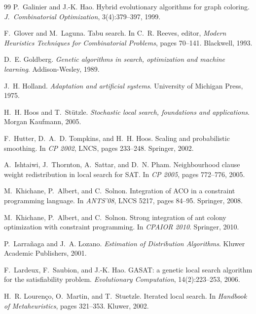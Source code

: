 \documentclass[12pt,a4paper]{book}
\begin{document}
\begin{thebibliography}{99}
P.~Galinier and J.-K. Hao.
\newblock Hybrid evolutionary algorithms for graph coloring.
\newblock \textit{J.\ Combinatorial Optimization}, 3(4):379--397, 1999.

F.~Glover and M.~Laguna.
\newblock Tabu search.
\newblock In C.~R. Reeves, editor, \textit{Modern Heuristics Techniques for Combinatorial Problems}, pages 70--141. Blackwell, 1993.

D.~E. Goldberg.
\newblock \textit{Genetic algorithms in search, optimization and machine learning}.
\newblock Addison-Wesley, 1989.

J.~H. Holland.
\newblock \textit{Adaptation and artificial systems}.
\newblock University of Michigan Press, 1975.

H.~H. Hoos and T.~Stützle.
\newblock \textit{Stochastic local search, foundations and applications}.
\newblock Morgan Kaufmann, 2005.

F.~Hutter, D.~A.~D. Tompkins, and H.~H. Hoos.
\newblock Scaling and probabilistic smoothing.
\newblock In \textit{CP 2002}, LNCS, pages 233--248. Springer, 2002.

A.~Ishtaiwi, J.~Thornton, A.~Sattar, and D.~N. Pham.
\newblock Neighbourhood clause weight redistribution in local search for SAT.
\newblock In \textit{CP 2005}, pages 772--776, 2005.

M.~Khichane, P.~Albert, and C.~Solnon.
\newblock Integration of ACO in a constraint programming language.
\newblock In \textit{ANTS'08}, LNCS 5217, pages 84--95. Springer, 2008.

M.~Khichane, P.~Albert, and C.~Solnon.
\newblock Strong integration of ant colony optimization with constraint programming.
\newblock In \textit{CPAIOR 2010}. Springer, 2010.

P.~Larrañaga and J.~A. Lozano.
\newblock \textit{Estimation of Distribution Algorithms}.
\newblock Kluwer Academic Publishers, 2001.

F.~Lardeux, F.~Saubion, and J.-K. Hao.
\newblock GASAT: a genetic local search algorithm for the satisfiability problem.
\newblock \textit{Evolutionary Computation}, 14(2):223--253, 2006.

H.~R. Lourenço, O.~Martin, and T.~Stuetzle.
\newblock Iterated local search.
\newblock In \textit{Handbook of Metaheuristics}, pages 321--353. Kluwer, 2002.


\end{thebibliography}
\end{document}
